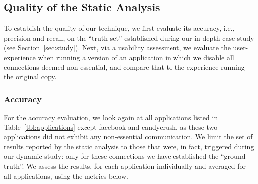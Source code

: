 
\subsection{Quality of the Static Analysis}
To establish the quality of our technique, we 
first evaluate its accuracy, i.e., precision and recall, on the ``truth set'' established during our in-depth case study (see Section~\ref{sec:study}).
Next, via a usability assessment, we evaluate the user-experience when running a version of an application in which we disable all connections deemed non-essential, and compare that to the experience running the original copy.  

\subsubsection{Accuracy}
For the accuracy evaluation, we look again at all applications listed in 
Table~\ref{tbl:applications} except facebook and candycrush, as these two applications  did not exhibit any non-essential communication. We limit the set of results reported by the static analysis to those that were, in fact, triggered during our dynamic study: only for these connections we have established the ``ground truth''. 
We assess the results, for each application individually and averaged for all applications, using the metrics below. 

